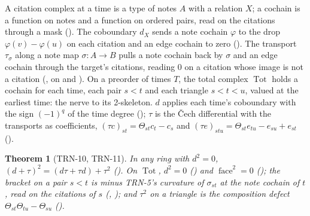 \documentclass[11pt]{article}
\theoremstyle{plain}
\newtheorem{theorem}{Theorem}[section]
\theoremstyle{definition}
\theoremstyle{remark}
\begin{document}
A citation complex at a time is a type of notes $A$ with a relation $X$; a cochain is a function
on notes and a function on ordered pairs, read on the citations through a mask
(). The coboundary $d_X$ sends a note cochain $\varphi$ to the drop
$\varphi(v) - \varphi(u)$ on each citation and an edge cochain to zero (). The transport
$\tau_\sigma$ along a note map $\sigma : A \to B$ pulls a note cochain back by $\sigma$ and an edge
cochain through the target's citations, reading $0$ on a citation whose image is not a citation
(, on  and ). On a preorder of times $T$, the total complex
$\operatorname{Tot}$ holds a cochain for each time, each pair $s < t$ and each triangle
$s < t < u$, valued at the earliest time: the nerve to its 2-skeleton. $d$ applies each time's
coboundary with the sign $(-1)^q$ of the time degree (); $\tau$ is the \v{C}ech
differential with the transports as coefficients, $(\tau c)_{st} = \Theta_{st} c_t - c_s$ and
$(\tau e)_{stu} = \Theta_{st} e_{tu} - e_{su} + e_{st}$ ().

\begin{theorem}[TRN-10, TRN-11]
In any ring with $d^2 = 0$, $(d + \tau)^2 = (d\tau + \tau d) + \tau^2$
(). On $\operatorname{Tot}$, $d^2 = 0$
() and $\operatorname{face}^2 = 0$ (); the bracket on
a pair $s < t$ is minus TRN-5's curvature of $\sigma_{st}$ at the note cochain of $t$, read on the
citations of $s$ (, ); and $\tau^2$ on a triangle is
the composition defect $\Theta_{st}\Theta_{tu} - \Theta_{su}$ ().
\end{theorem}
\end{document}
